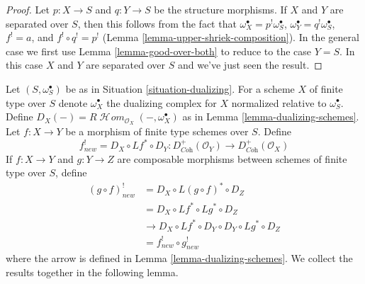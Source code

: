 \documentclass{stacks-project}
\theoremstyle{plain}
\theoremstyle{definition}
\theoremstyle{remark}
\numberwithin{equation}{subsection}
\def\SheafHom{\mathop{\mathcal{H}\!\mathit{om}}\nolimits}
\begin{document}
\begin{proof}
Let $p : X \to S$ and $q : Y \to S$ be the structure morphisms.
If $X$ and $Y$ are separated over $S$, then this follows
from the fact that $\omega_X^\bullet = p^!\omega_S^\bullet$,
$\omega_Y^\bullet = q^!\omega_S^\bullet$, $f^! = a$, and
$f^! \circ q^! = p^!$ (Lemma \ref{lemma-upper-shriek-composition}).
In the general case we first use Lemma \ref{lemma-good-over-both}
to reduce to the case $Y = S$. In this case $X$ and $Y$
are separated over $S$ and we've just seen the result.
\end{proof}

\noindent
Let $(S, \omega_S^\bullet)$ be as in Situation \ref{situation-dualizing}.
For a scheme $X$ of finite type over $S$ denote $\omega_X^\bullet$ the
dualizing complex for $X$ normalized relative to $\omega_S^\bullet$.
Define $D_X(-) = R\SheafHom_{\mathcal{O}_X}(-, \omega_X^\bullet)$
as in Lemma \ref{lemma-dualizing-schemes}.
Let $f : X \to Y$ be a morphism of finite type schemes over $S$.
Define
$$
f_{new}^! = D_X \circ Lf^* \circ D_Y :
D_{\textit{Coh}}^+(\mathcal{O}_Y)
\to
D_{\textit{Coh}}^+(\mathcal{O}_X)
$$
If $f : X \to Y$ and $g : Y \to Z$ are composable
morphisms between schemes of finite type over $S$, define
\begin{align*}
(g \circ f)^!_{new} & = D_X \circ L(g \circ f)^* \circ D_Z \\
& = D_X \circ Lf^* \circ Lg^* \circ D_Z \\
& \to D_X \circ Lf^* \circ D_Y \circ D_Y \circ Lg^* \circ D_Z \\
& = f^!_{new} \circ g^!_{new}
\end{align*}
where the arrow is defined in Lemma \ref{lemma-dualizing-schemes}.
We collect the results together in the following lemma.
\end{document}
